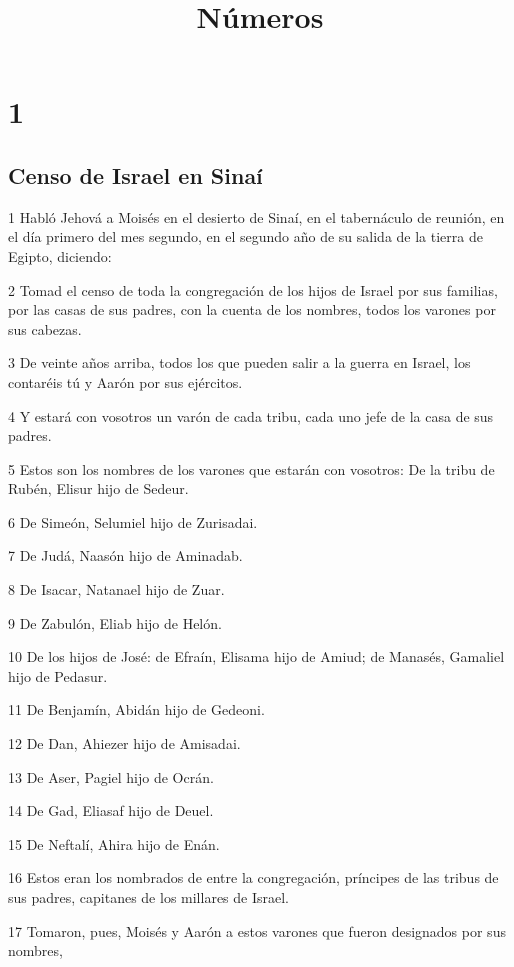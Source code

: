 

\title{Números}

\chapter{1}


\section*{Censo de Israel en Sinaí}

\par 1 Habló Jehová a Moisés en el desierto de Sinaí, en el tabernáculo de reunión, en el día primero del mes segundo, en el segundo año de su salida de la tierra de Egipto, diciendo:
\par 2 Tomad el censo de toda la congregación de los hijos de Israel por sus familias, por las casas de sus padres, con la cuenta de los nombres, todos los varones por sus cabezas.
\par 3 De veinte años arriba, todos los que pueden salir a la guerra en Israel, los contaréis tú y Aarón por sus ejércitos.
\par 4 Y estará con vosotros un varón de cada tribu, cada uno jefe de la casa de sus padres.
\par 5 Estos son los nombres de los varones que estarán con vosotros: De la tribu de Rubén, Elisur hijo de Sedeur.
\par 6 De Simeón, Selumiel hijo de Zurisadai.
\par 7 De Judá, Naasón hijo de Aminadab.
\par 8 De Isacar, Natanael hijo de Zuar.
\par 9 De Zabulón, Eliab hijo de Helón.
\par 10 De los hijos de José: de Efraín, Elisama hijo de Amiud; de Manasés, Gamaliel hijo de Pedasur.
\par 11 De Benjamín, Abidán hijo de Gedeoni.
\par 12 De Dan, Ahiezer hijo de Amisadai.
\par 13 De Aser, Pagiel hijo de Ocrán.
\par 14 De Gad, Eliasaf hijo de Deuel. 
\par 15 De Neftalí, Ahira hijo de Enán.
\par 16 Estos eran los nombrados de entre la congregación, príncipes de las tribus de sus padres, capitanes de los millares de Israel.
\par 17 Tomaron, pues, Moisés y Aarón a estos varones que fueron designados por sus nombres,
